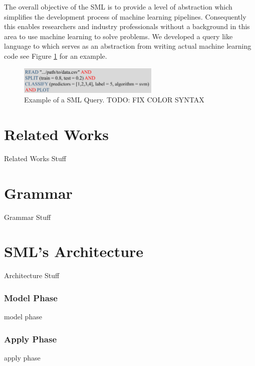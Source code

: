 \documentclass[jair,twoside,11pt,theapa]{article}
\begin{document}
The overall objective of the SML is to provide a level of abstraction which simplifies the development process of machine learning pipelines. Consequently this enables researchers and industry professionals without a background in this area to use machine learning to solve problems. We developed a query like language to which serves as an abstraction from writing actual machine learning code see Figure \ref{fig:sml-ex-1} for an example.   

\begin{figure}
\includegraphics[width=0.6\textwidth]{figs/sml-ex-1.png}
\centering
\caption{Example of a SML Query. TODO: FIX COLOR SYNTAX}
\label{fig:sml-ex-1}
\end{figure}

\section{Related Works}
\label{RelatedWorks}

Related Works Stuff

\section{Grammar}
\label{grammar}

Grammar Stuff

\section{SML's Architecture}
\label{sml-architecture}

Architecture Stuff

\subsubsection{Model Phase}
model phase
\subsubsection{Apply Phase}
apply phase
\end{document}
